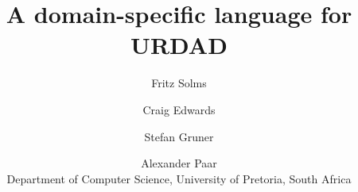 \documentclass[11pt]{article}
\begin{document}
\title{A domain-specific language for URDAD}
\author{Fritz Solms \and Craig Edwards \and Stefan Gruner \and Alexander Paar
\\ Department of Computer Science, University of Pretoria, South Africa}

\maketitle



\listoftodos




















 

\end{document}
